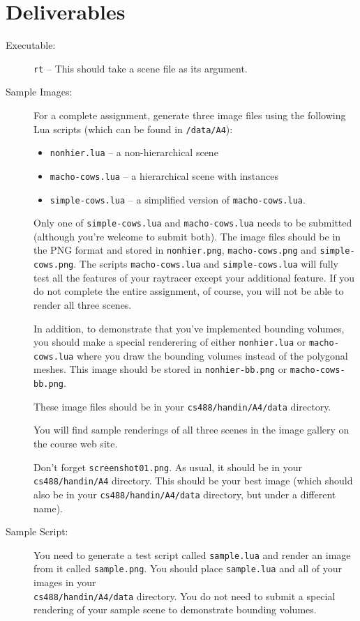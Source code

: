 \section{Deliverables}
\begin{description}

\item[Executable:] {\tt rt} -- This should take a scene file as its argument.
\item[Sample Images:]
	For a complete assignment, generate three image files 
	using the following Lua scripts (which can be found in 
	{\tt \CourseData/data/A4}):
	\begin{itemize}
		\item {\tt nonhier.lua} -- a non-hierarchical scene
		\item {\tt macho-cows.lua} -- a hierarchical scene with instances
		\item {\tt simple-cows.lua} -- a simplified version of
			{\tt macho-cows.lua}.
	\end{itemize}
	Only one of {\tt simple-cows.lua} and {\tt macho-cows.lua} needs to be
	submitted (although you're welcome to submit both).
	The image files should be in the PNG format and stored 
	in {\tt nonhier.png}, {\tt macho-cows.png} and 
	{\tt simple-cows.png}.
	The scripts {\tt macho-cows.lua} and {\tt simple-cows.lua}
	will fully test all the features
	of your raytracer except your additional feature.  
	If you do not complete the entire assignment, of course, you
        will not be able to render all three scenes.

	In addition, to demonstrate that you've implemented bounding volumes,
	you should make a special renderering of either {\tt nonhier.lua} or
	{\tt macho-cows.lua} where you draw the bounding volumes instead of
	the polygonal meshes.  This image should be stored in
	{\tt nonhier-bb.png} or {\tt macho-cows-bb.png}.

	These image files should be in your {\tt cs488/handin/A4/data} 
	directory.

	You will find sample renderings of all three scenes in the
	image gallery on the course web site.

	Don't forget \texttt{screenshot01.png}.  As usual, it should be
	in your \texttt{cs488/handin/A4} directory.  This should be your
	best image (which should also be in your \texttt{cs488/handin/A4/data} 
	directory, but under a different name).

\item[Sample Script:]
	You need to generate a test script called {\tt sample.lua} and
	render an image from it called {\tt sample.png}.  You should
	place {\tt sample.lua} and all of your images in your \\
	\texttt{cs488/handin/A4/data} directory.
	You do not need to submit a special rendering of your sample
	scene to demonstrate bounding volumes.


\end{description}
